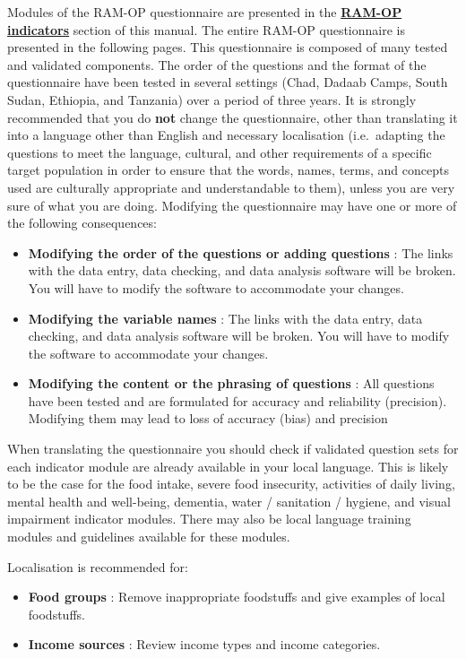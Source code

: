 \documentclass[12pt,a4paper]{book}
\providecommand{\tightlist}{%
  \setlength{\itemsep}{0pt}\setlength{\parskip}{0pt}}
\begin{document}
Modules of the RAM-OP questionnaire are presented in the \protect\hyperlink{indicators}{\textbf{RAM-OP indicators}} section of this manual.
The entire RAM-OP questionnaire is presented in the following pages. This questionnaire is composed of many tested and validated components. The order of the questions and the format of the questionnaire have been tested in several settings (Chad, Dadaab Camps, South Sudan, Ethiopia, and Tanzania) over a period of three years. It is strongly recommended that you do \textbf{not} change the questionnaire, other than translating it into a language other than English and necessary localisation (i.e.~adapting the questions to meet the language, cultural, and other requirements of a specific target population in order to ensure that the words, names, terms, and concepts used are culturally appropriate and understandable to them), unless you are very sure of what you are doing. Modifying the questionnaire may have one or more of the following consequences:

\begin{itemize}
\item
  \textbf{Modifying the order of the questions or adding questions} : The links with the data entry, data checking, and data analysis software will be broken. You will have to modify the software to accommodate your changes.
\item
  \textbf{Modifying the variable names} : The links with the data entry, data checking, and data analysis software will be broken. You will have to modify the software to accommodate your changes.
\item
  \textbf{Modifying the content or the phrasing of questions} : All questions have been tested and are formulated for accuracy and reliability (precision). Modifying them may lead to loss of accuracy (bias) and precision
\end{itemize}

When translating the questionnaire you should check if validated question sets for each indicator module are already available in your local language. This is likely to be the case for the food intake, severe food insecurity, activities of daily living, mental health and well-being, dementia, water / sanitation / hygiene, and visual impairment indicator modules. There may also be local language training modules and guidelines available for these modules.

Localisation is recommended for:

\begin{itemize}
\tightlist
\item
  \textbf{Food groups} : Remove inappropriate foodstuffs and give examples of local foodstuffs.
\item
  \textbf{Income sources} : Review income types and income categories.
\end{itemize}
\end{document}
